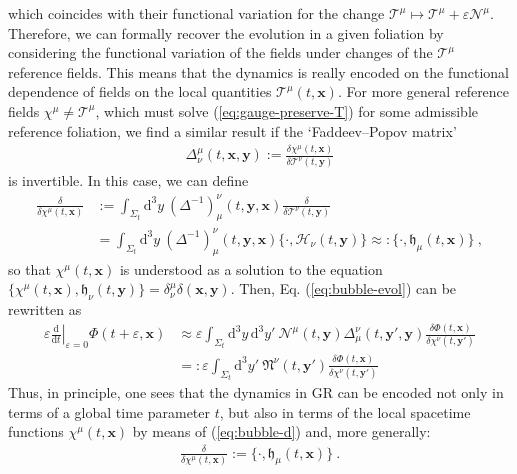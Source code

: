 \documentclass[12pt]{iopart}
\def\eq#1{\begin{equation}\begin{aligned}#1\end{aligned}\end{equation}}
\def\eref#1{(\ref{eq:#1})}
\def\D{\mathrm{d}}
\def\Del#1#2{\frac{\D#1}{\D#2}}
\def\x{\mathbf{x}}
\def\y{\mathbf{y}}
\begin{document}
which coincides with their functional variation for the change $\mathcal{T}^{\mu}\mapsto\mathcal{T}^{\mu}+\varepsilon\mathcal{N}^{\mu}$. Therefore, we can formally recover the evolution in a given foliation by considering the functional variation of the fields under changes of the $\mathcal{T}^{\mu}$ reference fields. This means that the dynamics is really encoded on the functional dependence of fields on the local quantities $\mathcal{T}^{\mu}(t,\x)$. For more general reference fields $\chi^{\mu}\neq\mathcal{T}^{\mu}$, which must solve \eref{gauge-preserve-T} for some admissible reference foliation, we find a similar result if the `Faddeev--Popov matrix'
\eq{\label{eq:FPmatrix}
\Delta^{\mu}_{\nu}(t,\x,\y) := \frac{\delta\chi^{\mu}(t,\x)}{\delta\mathcal{T}^{\nu}(t,\y)}
}
is invertible. In this case, we can define
\eq{\label{eq:bubble-d-chi}
\frac{\delta}{\delta\chi^{\mu}(t,\x)}&:= \int_{\Sigma_t}\D^3y\ (\Delta^{-1})^{\nu}_{\mu}(t,\y,\x)\frac{\delta}{\delta\mathcal{T}^{\nu}(t,\y)}\\
&= \int_{\Sigma_t}\D^3y\ (\Delta^{-1})^{\nu}_{\mu}(t,\y,\x)\{\cdot,\mathcal{H}_{\nu}(t,\y)\}\approx: \{\cdot,\mathfrak{h}_{\mu}(t,\x)\} \ ,
}
so that $\chi^{\mu}(t,\x)$ is understood as a solution to the equation $\{\chi^{\mu}(t,\x),\mathfrak{h}_{\nu}(t,\y)\} = \delta^{\mu}_{\nu}\delta(\x,\y)$. Then, Eq. \eref{bubble-evol} can be rewritten as
\eq{\label{eq:bubble-evol-2}
\varepsilon\left.\Del{}{t}\right|_{\varepsilon=0} \Phi(t+\varepsilon,\x) &\approx  \varepsilon\int_{\Sigma_t}\D^3y\,\D^3y'\ \mathcal{N}^{\mu}(t,\y)\Delta^{\nu}_{\mu}(t,\y',\y)\frac{\delta\Phi(t,\x)}{\delta\chi^{\nu}(t,\y')}\\
&=: \varepsilon\int_{\Sigma_t}\D^3y'\ \mathfrak{N}^{\nu}(t,\y')\frac{\delta\Phi(t,\x)}{\delta\chi^{\nu}(t,\y')}
}
Thus, in principle, one sees that the dynamics in GR can be encoded not only in terms of a global time parameter $t$, but also in terms of the local spacetime functions $\chi^{\mu}(t,\x)$ by means of \eref{bubble-d} and, more generally:
\eq{\label{eq:bubble-d-gen}
\frac{\delta}{\delta\chi^{\mu}(t,\x)} := \{\cdot,\mathfrak{h}_{\mu}(t,\x)\} \ .
}
\end{document}
